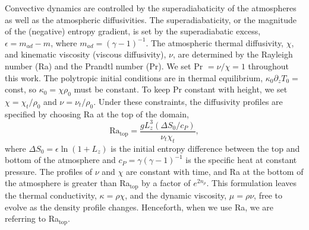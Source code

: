 \documentclass[aps, prl, twocolumn, nofootinbib, groupedaddress, amsfonts, amssymb, amsmath]{revtex4-1}
\begin{document}
Convective dynamics are controlled by the superadiabaticity
of the atmospheres as well as the atmospheric diffusivities.
The superadiabaticity, or the magnitude of the (negative) 
entropy gradient, is set by 
the superadiabatic excess, $\epsilon = m_{ad} - m$, where 
$m_{ad} = (\gamma - 1)^{-1}$.
The atmospheric thermal diffusivity, $\chi$,
and kinematic viscosity (viscous diffusivity), $\nu$,
are determined by the Rayleigh number (Ra) and the Prandtl
number (Pr).  We set $\text{Pr } = \nu/\chi = 1$ throughout
this work. The polytropic initial conditions are in
thermal equilibrium, $\kappa_0 \partial_z T_0 =$ const,
so $\kappa_0 = \chi \rho_0$ must be constant. To keep
Pr constant with height, we set $\chi = \chi_t/\rho_0$
and $\nu = \nu_t/\rho_0$.  Under these constraints, the
diffusivity profiles are specified by choosing Ra
at the top of the domain,
\begin{equation}
\text{Ra}_{\text{top}} = \frac{g L_z^3 (\Delta S_0 / c_P)}{\nu_t\chi_t},
\end{equation}
where $\Delta S_0 = \epsilon\ln (1 + L_z)$ is the initial entropy difference 
between the top and bottom of the atmosphere and
$c_P = \gamma(\gamma-1)^{-1}$ is the specific heat 
at constant pressure. The profiles of $\nu$ and $\chi$ are constant with
time, and Ra at the bottom of the atmosphere is greater than Ra$_{\text{top}}$
by a factor of $e^{2n_{\rho}}$.  This formulation leaves
the thermal conductivity, $\kappa = \rho\chi$, and
the dynamic viscosity, $\mu = \rho\nu$, free to evolve
as the density profile changes.  Henceforth,
when we use Ra, we are referring to Ra$_{\text{top}}$.
\end{document}
